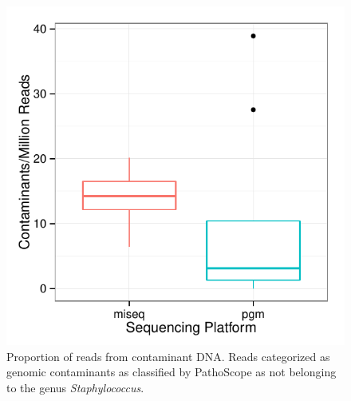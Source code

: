 \documentclass[smallextended]{svjour3}\usepackage[]{graphicx}\usepackage[]{color}
\makeatletter
\def\maxwidth{ %
  \ifdim\Gin@nat@width>\linewidth
    \linewidth
  \else
    \Gin@nat@width
  \fi
}
\newenvironment{knitrout}{}{} %
\makeatother
\begin{document}
\begin{knitrout}
\color{fgcolor}\begin{figure}

{\centering \includegraphics[width=\maxwidth]{figure/contamCountsFig-1} 

}

\caption[Proportion of reads from contaminant DNA]{Proportion of reads from contaminant DNA. Reads categorized as genomic contaminants as classified by PathoScope as not belonging to the genus \textit{Staphylococcus}.}\label{fig:contamCountsFig}
\end{figure}


\end{knitrout}
\end{document}
